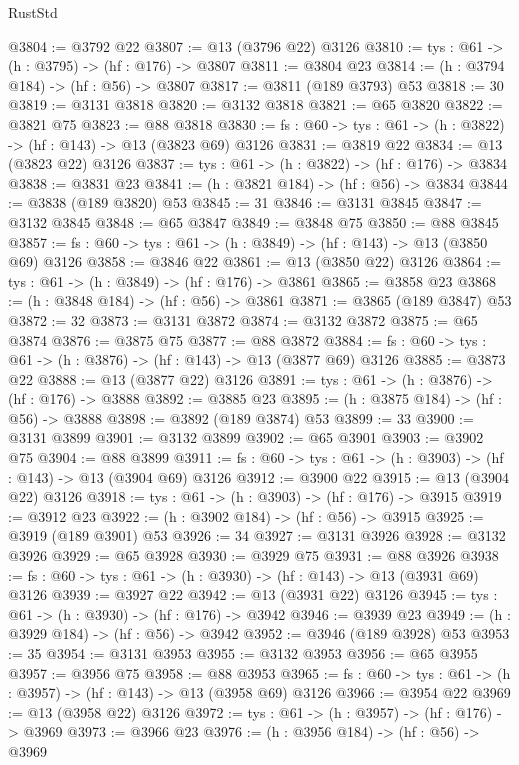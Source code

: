 \begin{lexlean}{RustStd}
\begin{coremodule}
@3804 := @3792 @22
@3807 := @13 (@3796 @22) @3126
@3810 := {tys : @61} -> (h : @3795) -> (hf : @176) -> @3807
@3811 := @3804 @23
@3814 := (h : @3794 @184) -> (hf : @56) -> @3807
@3817 := @3811 (@189 @3793) @53
@3818 := 30
@3819 := @3131 @3818
@3820 := @3132 @3818
@3821 := @65 @3820
@3822 := @3821 @75
@3823 := @88 @3818
@3830 := {fs : @60} -> {tys : @61} -> (h : @3822) -> (hf : @143) -> @13 (@3823 @69) @3126
@3831 := @3819 @22
@3834 := @13 (@3823 @22) @3126
@3837 := {tys : @61} -> (h : @3822) -> (hf : @176) -> @3834
@3838 := @3831 @23
@3841 := (h : @3821 @184) -> (hf : @56) -> @3834
@3844 := @3838 (@189 @3820) @53
@3845 := 31
@3846 := @3131 @3845
@3847 := @3132 @3845
@3848 := @65 @3847
@3849 := @3848 @75
@3850 := @88 @3845
@3857 := {fs : @60} -> {tys : @61} -> (h : @3849) -> (hf : @143) -> @13 (@3850 @69) @3126
@3858 := @3846 @22
@3861 := @13 (@3850 @22) @3126
@3864 := {tys : @61} -> (h : @3849) -> (hf : @176) -> @3861
@3865 := @3858 @23
@3868 := (h : @3848 @184) -> (hf : @56) -> @3861
@3871 := @3865 (@189 @3847) @53
@3872 := 32
@3873 := @3131 @3872
@3874 := @3132 @3872
@3875 := @65 @3874
@3876 := @3875 @75
@3877 := @88 @3872
@3884 := {fs : @60} -> {tys : @61} -> (h : @3876) -> (hf : @143) -> @13 (@3877 @69) @3126
@3885 := @3873 @22
@3888 := @13 (@3877 @22) @3126
@3891 := {tys : @61} -> (h : @3876) -> (hf : @176) -> @3888
@3892 := @3885 @23
@3895 := (h : @3875 @184) -> (hf : @56) -> @3888
@3898 := @3892 (@189 @3874) @53
@3899 := 33
@3900 := @3131 @3899
@3901 := @3132 @3899
@3902 := @65 @3901
@3903 := @3902 @75
@3904 := @88 @3899
@3911 := {fs : @60} -> {tys : @61} -> (h : @3903) -> (hf : @143) -> @13 (@3904 @69) @3126
@3912 := @3900 @22
@3915 := @13 (@3904 @22) @3126
@3918 := {tys : @61} -> (h : @3903) -> (hf : @176) -> @3915
@3919 := @3912 @23
@3922 := (h : @3902 @184) -> (hf : @56) -> @3915
@3925 := @3919 (@189 @3901) @53
@3926 := 34
@3927 := @3131 @3926
@3928 := @3132 @3926
@3929 := @65 @3928
@3930 := @3929 @75
@3931 := @88 @3926
@3938 := {fs : @60} -> {tys : @61} -> (h : @3930) -> (hf : @143) -> @13 (@3931 @69) @3126
@3939 := @3927 @22
@3942 := @13 (@3931 @22) @3126
@3945 := {tys : @61} -> (h : @3930) -> (hf : @176) -> @3942
@3946 := @3939 @23
@3949 := (h : @3929 @184) -> (hf : @56) -> @3942
@3952 := @3946 (@189 @3928) @53
@3953 := 35
@3954 := @3131 @3953
@3955 := @3132 @3953
@3956 := @65 @3955
@3957 := @3956 @75
@3958 := @88 @3953
@3965 := {fs : @60} -> {tys : @61} -> (h : @3957) -> (hf : @143) -> @13 (@3958 @69) @3126
@3966 := @3954 @22
@3969 := @13 (@3958 @22) @3126
@3972 := {tys : @61} -> (h : @3957) -> (hf : @176) -> @3969
@3973 := @3966 @23
@3976 := (h : @3956 @184) -> (hf : @56) -> @3969

\end{coremodule}
\end{lexlean}
